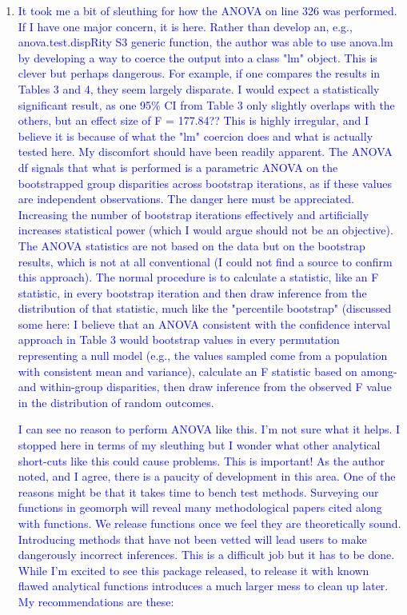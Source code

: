 \documentclass[12pt,letterpaper]{article}
\begin{document}
\begin{enumerate}
\item{\textcolor{blue}{It took me a bit of sleuthing for how the ANOVA on line 326 was performed. 
If I have one major concern, it is here. 
Rather than develop an, e.g., anova.test.dispRity S3 generic function, the author was able to use anova.lm by developing a way to coerce the output into a class "lm" object. 
This is clever but perhaps dangerous. 
For example, if one compares the results in Tables 3 and 4, they seem largely disparate. 
I would expect a statistically significant result, as one 95\% CI from Table 3 only slightly overlaps with the others, but an effect size of F = 177.84?? 
This is highly irregular, and I believe it is because of what the "lm" coercion does and what is actually tested here. 
My discomfort should have been readily apparent. 
The ANOVA df signals that what is performed is a parametric ANOVA on the bootstrapped group disparities across bootstrap iterations, as if these values are independent observations. 
The danger here must be appreciated.
Increasing the number of bootstrap iterations effectively and artificially increases statistical power (which I would argue should not be an objective). 
The ANOVA statistics are not based on the data but on the bootstrap results, which is not at all conventional (I could not find a source to confirm this approach). 
The normal procedure is to calculate a statistic, like an F statistic, in every bootstrap iteration and then draw inference from the distribution of that statistic, much like the "percentile bootstrap" (discussed some here:%
I believe that an ANOVA consistent with the confidence interval approach in Table 3 would bootstrap values in every permutation representing a null model (e.g., the values sampled come from a population with consistent mean and variance), calculate an F statistic based on among- and within-group disparities, then draw inference from the observed F value in the distribution of random outcomes.}}

\label{ANOVA}

\textcolor{blue}{I can see no reason to perform ANOVA like this.  I'm not sure what it helps.  I stopped here in terms of my sleuthing but I wonder what other analytical short-cuts like this could cause problems. This is important!  As the author noted, and I agree, there is a paucity of development in this area.  One of the reasons might be that it takes time to bench test methods.  Surveying our functions in geomorph will reveal many methodological papers cited along with functions.  We release functions once we feel they are theoretically sound.  Introducing methods that have not been vetted will lead users to make dangerously incorrect inferences.  This is a difficult job but it has to be done.  While I'm excited to see this package released, to release it with known flawed analytical functions introduces a much larger mess to clean up later.  My recommendations are these:}


\end{enumerate}
\end{document}
